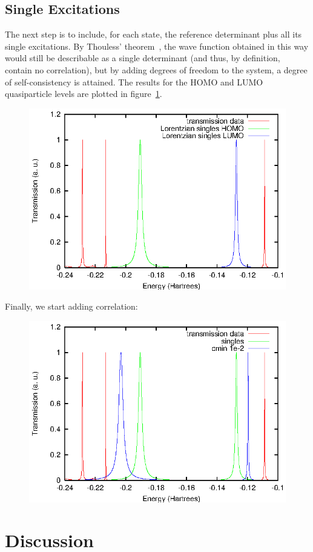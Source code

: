 \subsection{Single Excitations}
\label{subsec:singles}

The next step is to include, for each state, the reference determinant plus all
its single excitations. By Thouless' theorem~\cite{Thouless}, the wave function
obtained in this way would still be describable as a single determinant (and
thus, by definition, contain no correlation), but by adding degrees of freedom
to the system, a degree of self-consistency is attained. The results for the
HOMO and LUMO quasiparticle levels are plotted in figure~\ref{fig:singles}.

\begin{figure}
	\begin{center}
		\includegraphics[width=0.9\linewidth]{figures/singles}
	\end{center}
	\caption{}
	\label{fig:singles}
\end{figure}

Finally, we start adding correlation:

\begin{figure}
	\begin{center}
		\includegraphics[width=0.9\linewidth]{figures/1em2}
	\end{center}
	\caption{}
	\label{fig:1em2}
\end{figure}

\section{Discussion}
\label{sec:discussion}

